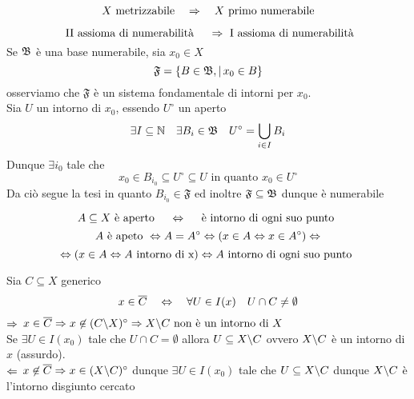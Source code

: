 \begin{fatto}
$$X \text{ metrizzabile} \quad \Rightarrow \quad X \text{ primo numerabile}$$
\end{fatto}
\begin{prop}
$$ \text{ II assioma di numerabilit\`a } \quad \Rightarrow \text{ I assioma di numerabilit\`a}$$
\proof Se $\mathfrak{B}$ \`e una base numerabile, sia $x_0 \in X$ 
$$ \mathfrak{F}=\{ B \in \mathfrak{B} , \vert \, x_0\in B \}$$
osserviamo che $\mathfrak{F}$ \`e un sistema fondamentale di intorni per $x_0$.\\
Sia $U$ un intorno di $x_0$, essendo  $U^\circ$ un aperto 
$$ \exists I \subseteq \mathbb{N} \quad \exists B_i \in \mathfrak{B} \quad U^\circ = \bigcup_{i\in I } B_i$$
Dunque $\exists i_0 $ tale che 
$$ x_0 \in B_{i_0} \subseteq U^\circ \subseteq U \text{ in quanto } x_0 \in U^\circ$$
Da ci\`o segue la tesi in quanto $B_{i_0}\in \mathfrak{F}$ ed inoltre $\mathfrak{F}\subseteq \mathfrak{B}$ dunque \`e numerabile
\endproof
\end{prop}
\spazio
\begin{prop}
$$ A\subseteq X \text{ \`e aperto } \quad \Leftrightarrow \quad \text{  \`e intorno di ogni suo punto } $$
\proof
$$ A\text{ \`e apeto } \Leftrightarrow A = A^\circ \Leftrightarrow ( x\in A \Leftrightarrow x\in A^\circ ) \Leftrightarrow$$
$$\Leftrightarrow ( x\in A \Leftrightarrow A\text{ intorno di x}) \Leftrightarrow A\text{ intorno di ogni suo punto } $$
\endproof
\end{prop}
\begin{prop}Sia $C\subseteq X$ generico
$$ x \in \overline{C} \quad \Leftrightarrow \quad \forall U \in I(x) \quad U \cap C \neq \emptyset$$
\proof$\Rightarrow$ 
$ x\in \overline{C}\Rightarrow x\not \in (C\backslash X)^\circ \Rightarrow X \backslash C \text{ non \`e un intorno di } X$\\
Se $\exists U \in I(x_0)$ tale che $U \cap C = \emptyset$ allora $U \subseteq X\backslash C$ ovvero $X\backslash C $ \`e un intorno di $x$ (assurdo).\\
$\Leftarrow$  $x\not \in \overline{C}\Rightarrow x\in (X\backslash C)^\circ$ dunque 
$\exists U \in I(x_0)$ tale che $U \subseteq X \backslash C $ dunque $X\backslash C$ \`e l'intorno disgiunto cercato
\endproof

\end{prop}
\newpage

